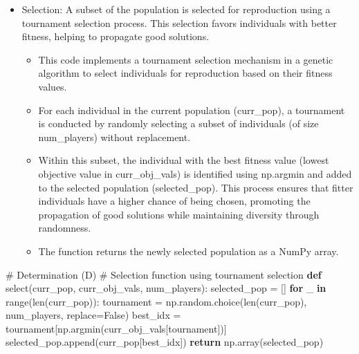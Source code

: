 \documentclass[
  letterpaper,
  DIV=11,
  numbers=noendperiod]{scrreprt}
\newenvironment{Shaded}{\begin{snugshade}}{\end{snugshade}}
\newcommand{\BuiltInTok}[1]{\textcolor[rgb]{0.00,0.23,0.31}{#1}}
\newcommand{\CommentTok}[1]{\textcolor[rgb]{0.37,0.37,0.37}{#1}}
\newcommand{\ControlFlowTok}[1]{\textcolor[rgb]{0.00,0.23,0.31}{\textbf{#1}}}
\newcommand{\KeywordTok}[1]{\textcolor[rgb]{0.00,0.23,0.31}{\textbf{#1}}}
\newcommand{\NormalTok}[1]{\textcolor[rgb]{0.00,0.23,0.31}{#1}}
\newcommand{\OperatorTok}[1]{\textcolor[rgb]{0.37,0.37,0.37}{#1}}
\newcommand{\VariableTok}[1]{\textcolor[rgb]{0.07,0.07,0.07}{#1}}
\providecommand{\tightlist}{%
  \setlength{\itemsep}{0pt}\setlength{\parskip}{0pt}}\usepackage{longtable,booktabs,array}
\begin{document}
\begin{itemize}
\tightlist
\item
  Selection: A subset of the population is selected for reproduction
  using a tournament selection process. This selection favors
  individuals with better fitness, helping to propagate good solutions.

  \begin{itemize}
  \tightlist
  \item
    This code implements a tournament selection mechanism in a genetic
    algorithm to select individuals for reproduction based on their
    fitness values.
  \item
    For each individual in the current population (curr\_pop), a
    tournament is conducted by randomly selecting a subset of
    individuals (of size num\_players) without replacement.
  \item
    Within this subset, the individual with the best fitness value
    (lowest objective value in curr\_obj\_vals) is identified using
    np.argmin and added to the selected population (selected\_pop). This
    process ensures that fitter individuals have a higher chance of
    being chosen, promoting the propagation of good solutions while
    maintaining diversity through randomness.
  \item
    The function returns the newly selected population as a NumPy array.
  \end{itemize}
\end{itemize}

\begin{Shaded}
\begin{Highlighting}[]
\CommentTok{\# Determination (D)}
\CommentTok{\# Selection function using tournament selection}
\KeywordTok{def}\NormalTok{ select(curr\_pop, curr\_obj\_vals, num\_players):}
\NormalTok{    selected\_pop }\OperatorTok{=}\NormalTok{ []}
    \ControlFlowTok{for}\NormalTok{ \_ }\KeywordTok{in} \BuiltInTok{range}\NormalTok{(}\BuiltInTok{len}\NormalTok{(curr\_pop)):}
\NormalTok{        tournament }\OperatorTok{=}\NormalTok{ np.random.choice(}\BuiltInTok{len}\NormalTok{(curr\_pop), num\_players, replace}\OperatorTok{=}\VariableTok{False}\NormalTok{)}
\NormalTok{        best\_idx }\OperatorTok{=}\NormalTok{ tournament[np.argmin(curr\_obj\_vals[tournament])]}
\NormalTok{        selected\_pop.append(curr\_pop[best\_idx])}
    \ControlFlowTok{return}\NormalTok{ np.array(selected\_pop)}
\end{Highlighting}
\end{Shaded}
\end{document}

